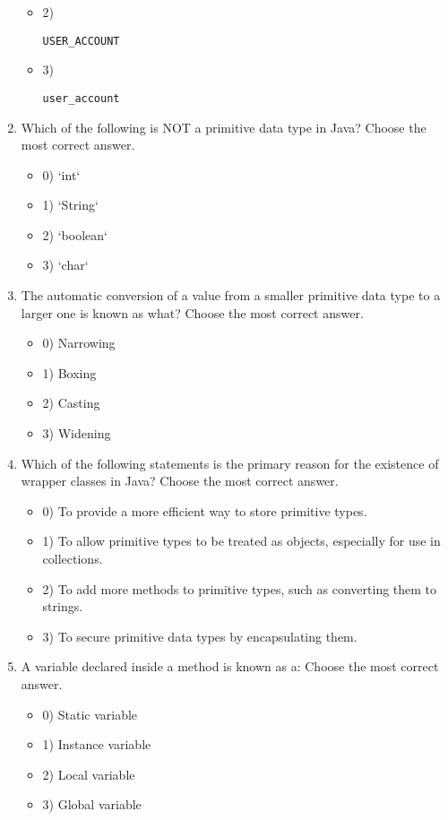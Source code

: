\documentclass[12pt]{article}
\begin{document}
\begin{enumerate}[label=(\arabic*)]
\begin{itemize}
\item 2) \begin{verbatim}USER_ACCOUNT\end{verbatim}
\item 3) \begin{verbatim}user_account\end{verbatim}
\end{itemize}
\item Which of the following is NOT a primitive data type in Java?
Choose the most correct answer. 
\begin{itemize}
\item 0) `int`
\item 1) `String`
\item 2) `boolean`
\item 3) `char`
\end{itemize}
\item The automatic conversion of a value from a smaller primitive data type to a larger one is known as what?
Choose the most correct answer. 
\begin{itemize}
\item 0) Narrowing
\item 1) Boxing
\item 2) Casting
\item 3) Widening
\end{itemize}
\item Which of the following statements is the primary reason for the existence of wrapper classes in Java?
Choose the most correct answer. 
\begin{itemize}
\item 0) To provide a more efficient way to store primitive types.
\item 1) To allow primitive types to be treated as objects, especially for use in collections.
\item 2) To add more methods to primitive types, such as converting them to strings.
\item 3) To secure primitive data types by encapsulating them.
\end{itemize}
\item A variable declared inside a method is known as a:
Choose the most correct answer. 
\begin{itemize}
\item 0) Static variable
\item 1) Instance variable
\item 2) Local variable
\item 3) Global variable

\end{itemize}
\end{enumerate}
\end{document}
